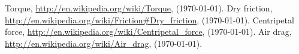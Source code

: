 \documentclass[a4paper]{article}
\begin{document}
\begin{thebibliography}{99}
%	
%
		
%
%
%	
 Torque, \url{http://en.wikipedia.org/wiki/Torque}, (\today).
 Dry friction, \url{http://en.wikipedia.org/wiki/Friction#Dry_friction}, (\today).
 Centripetal force, \url{http://en.wikipedia.org/wiki/Centripetal_force}, (\today).
 Air drag, \url{http://en.wikipedia.org/wiki/Air_drag}, (\today).
\end{thebibliography}
\end{document}
